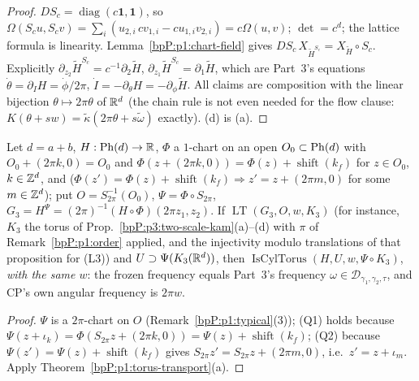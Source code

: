 \begin{proof}
\label{stepP:p1:pc-a} $DS_c=\operatorname{diag}(c\mathbf 1,\mathbf 1)$, so $\Omega(S_cu,S_cv)=\sum_i(u_{2,i}\,cv_{1,i}-cu_{1,i}v_{2,i})=c\Omega(u,v)$; $\det=c^d$; the lattice formula is linearity.
\label{stepP:p1:pc-b} Lemma~\ref{bpP:p1:chart-field} gives $DS_c\,X_{\tilde H^{S_c}}=X_{\tilde H}\circ S_c$. Explicitly $\partial_{z_2}\tilde H^{S_c}=c^{-1}\partial_2\tilde H$, $\partial_{z_1}\tilde H^{S_c}=\partial_1\tilde H$, which are Part~3's equations $\dot\theta=\partial_IH=\dot\phi/2\pi$, $\dot I=-\partial_\theta H=-\partial_\phi\tilde H$.
\label{stepP:p1:pc-c} All claims are composition with the linear bijection $\theta\mapsto2\pi\theta$ of $\mathbb{R}^d$ (the chain rule is not even needed for the flow clause: $K(\theta+sw)=\tilde\kappa(2\pi\theta+s\tilde\omega)$ exactly). (d) is (a).
\end{proof}

\begin{corollary}\label{bpP:p1:cyl-pipeline}
Let $d=a+b$, $H:\mathrm{Ph}(d)\to\mathbb{R}$, $\Phi$ a $1$-chart on an open $O_0\subset\mathrm{Ph}(d)$ with $O_0+(2\pi k,0)=O_0$ and $\Phi(z+(2\pi k,0))=\Phi(z)+\operatorname{shift}(k_f)$ for $z\in O_0$, $k\in\mathbb{Z}^d$, and ($\Phi(z')=\Phi(z)+\operatorname{shift}(k_f)\Rightarrow z'=z+(2\pi m,0)$ for some $m\in\mathbb{Z}^d$); put $O=S_{2\pi}^{-1}(O_0)$, $\Psi=\Phi\circ S_{2\pi}$, $G_3=H^\Psi=(2\pi)^{-1}(H\circ\Phi)(2\pi z_1,z_2)$. If $\operatorname{LT}(G_3,O,w,K_3)$ (for instance, $K_3$ the torus of Prop.~\ref{bpP:p3:two-scale-kam}(a)--(d) with $\pi$ of Remark~\ref{bpP:p1:order} applied, and the injectivity modulo translations of that proposition for (L3)) and $U\supset\Psi(K_3(\mathbb{R}^d))$, then $\operatorname{IsCylTorus}(H,U,w,\Psi\circ K_3)$, \emph{with the same $w$}: the frozen frequency equals Part~3's frequency $\omega\in\mathcal D_{\gamma_1,\gamma_2,\tau}$, and CP's own angular frequency is $2\pi w$.
\end{corollary}
\begin{proof}
$\Psi$ is a $2\pi$-chart on $O$ (Remark~\ref{bpP:p1:typical}(3)); (Q1) holds because $\Psi(z+\iota_k)=\Phi(S_{2\pi}z+(2\pi k,0))=\Psi(z)+\operatorname{shift}(k_f)$; (Q2) because $\Psi(z')=\Psi(z)+\operatorname{shift}(k_f)$ gives $S_{2\pi}z'=S_{2\pi}z+(2\pi m,0)$, i.e.\ $z'=z+\iota_m$. Apply Theorem~\ref{bpP:p1:torus-transport}(a).
\end{proof}

